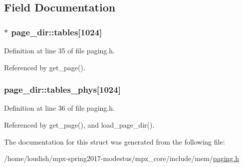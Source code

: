 \subsection{Field Documentation}
\subsubsection[{\texorpdfstring{tables}{tables}}]{$\ast$ page\+\_\+dir\+::tables\mbox{[}1024\mbox{]}}\hypertarget{structpage__dir_ac89434e3fccabfe9481ea77fdda82faf}{}\label{structpage__dir_ac89434e3fccabfe9481ea77fdda82faf}


Definition at line 35 of file paging.\+h.



Referenced by get\+\_\+page().

\subsubsection[{\texorpdfstring{tables\+\_\+phys}{tables_phys}}]{ page\+\_\+dir\+::tables\+\_\+phys\mbox{[}1024\mbox{]}}\hypertarget{structpage__dir_a7336b695acaf516613dda626129129d0}{}\label{structpage__dir_a7336b695acaf516613dda626129129d0}


Definition at line 36 of file paging.\+h.



Referenced by get\+\_\+page(), and load\+\_\+page\+\_\+dir().



The documentation for this struct was generated from the following file\+:\begin{DoxyCompactItemize}
\item 
/home/loudish/mpx-\/spring2017-\/modestus/mpx\+\_\+core/include/mem/\hyperlink{paging_8h}{paging.\+h}\end{DoxyCompactItemize}
